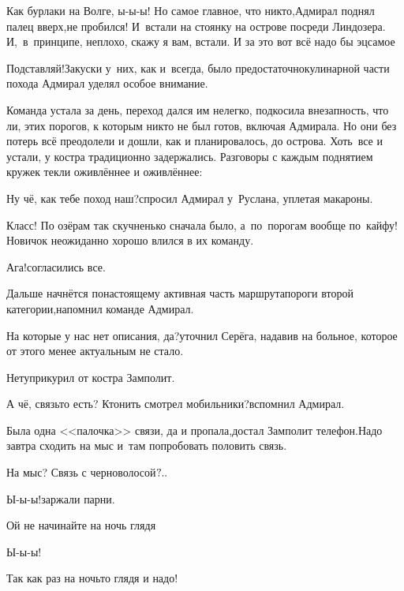 \diagdash Как бурлаки на Волге, ы-ы-ы! Но самое главное, что никто,\mdash Адмирал поднял палец вверх,\mdash не пробился! И~встали на стоянку на острове посреди Линдозера. И,~в~принципе, неплохо, скажу я вам, встали. И за это вот всё надо бы эц\sdash самое\myldots{}


\diagdash Подставляй!\mdash Закуски у~них, как и~всегда, было предостаточно\mdash кулинарной части похода Адмирал уделял особое внимание.

Команда устала за день, переход дался им нелегко, подкосила внезапность, что ли, этих порогов, к которым никто не был готов, включая Адмирала. Но они без потерь всё преодолели и дошли, как и планировалось, до острова. Хоть~все и устали, у костра традиционно задержались. Разговоры с каждым поднятием кружек текли оживлённее и оживлённее:

\diagdash Ну чё, как тебе поход наш?\mdash спросил Адмирал у~Руслана, уплетая макароны.

\diagdash Класс! По озёрам так скучненько сначала было, а~по~порогам вообще по~кайфу!\mdash Новичок неожиданно хорошо влился в их команду.

\diagdash Ага!\mdash согласились все.

\diagdash Дальше начнётся по\sdash настоящему активная часть маршрута\mdash пороги второй категории,\mdash напомнил команде Адмирал.

\diagdash На которые у нас нет описания, да?\mdash уточнил Серёга, надавив на больное, которое от этого менее актуальным не стало.

\diagdash Нету\myldots{}\mdash прикурил от костра Замполит.

\diagdash А чё, связь\sdash то есть? Кто\sdash нить смотрел мобильники?\mdash вспомнил Адмирал.

\diagdash Была одна <<палочка>> связи, да и пропала,\mdash достал Замполит телефон.\mdash Надо завтра сходить на мыс и~там попробовать половить связь.

\diagdash На мыс? Связь с черноволосой$\quldots$ %

\diagdash Ы-ы-ы!\mdash заржали парни.

\diagdash Ой не начинайте на ночь глядя\myldots{}

\diagdash Ы-ы-ы!

\diagdash Так как раз на ночь\sdash то глядя и надо!

